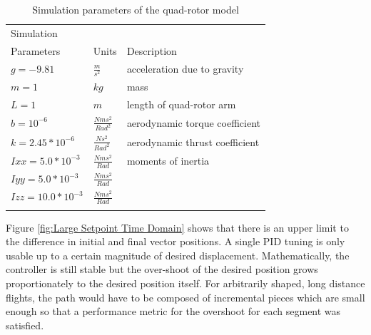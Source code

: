 \begin{table}
\label{table:params}
\begin{doublespace}
\centering
\begin{tabular}{l l l}
    Simulation\\ Parameters & Units & Description\\
    \hline
    $g = -9.81            $& $ \frac{m}{s^2}          $ & acceleration due to gravity\\
    $m = 1                $& $ kg                      $ & mass\\
    $L = 1                $& $ m                       $ & length of quad-rotor arm\\
    $b = 10^{-6}          $& $ \frac{N m s^2}{Rad^2}  $ & aerodynamic torque coefficient\\
    $k = 2.45*10^{-6}     $& $ \frac{N s^2}{Rad^2}    $ & aerodynamic thrust coefficient\\
    $Ixx = 5.0*10^{-3}    $& $ \frac{N m s^2}{Rad}    $ & moments of inertia \\
    $Iyy = 5.0*10^{-3}    $& $ \frac{N m s^2}{Rad}    $ & \\
    $Izz = 10.0*10^{-3}   $& $ \frac{N m s^2}{Rad}    $ & \\
    \hline
\caption[Simulation parameters of the quad-rotor model]{Simulation parameters of the quad-rotor model}
\end{tabular}
\end{doublespace}
\end{table}
Figure \ref{fig:Large Setpoint Time Domain} shows that there is an upper limit to the difference in initial and final vector positions. A single PID tuning is only usable up to a certain magnitude of desired displacement. Mathematically, the controller is still stable but the over-shoot of the desired position grows proportionately to the desired position itself. For arbitrarily shaped, long distance flights, the path would have to be composed of incremental pieces which are small enough so that a performance metric for the overshoot for each segment was satisfied.
